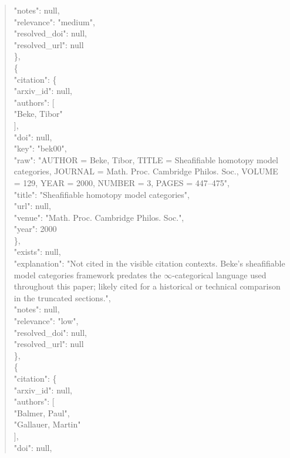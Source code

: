 \documentclass[11pt]{article}
\begin{document}
\begin{quote}
      "notes": null,\\
      "relevance": "medium",\\
      "resolved\_doi": null,\\
      "resolved\_url": null\\
    \},\\
    \{\\
      "citation": \{\\
        "arxiv\_id": null,\\
        "authors": [\\
          "Beke, Tibor"\\
        ],\\
        "doi": null,\\
        "key": "bek00",\\
        "raw": "AUTHOR = Beke, Tibor, TITLE = Sheafifiable homotopy model categories, JOURNAL = Math. Proc. Cambridge Philos. Soc., VOLUME = 129, YEAR = 2000, NUMBER = 3, PAGES = 447--475",\\
        "title": "Sheafifiable homotopy model categories",\\
        "url": null,\\
        "venue": "Math. Proc. Cambridge Philos. Soc.",\\
        "year": 2000\\
      \},\\
      "exists": null,\\
      "explanation": "Not cited in the visible citation contexts. Beke's sheafifiable model categories framework predates the \ensuremath{\infty}-categorical language used throughout this paper; likely cited for a historical or technical comparison in the truncated sections.",\\
      "notes": null,\\
      "relevance": "low",\\
      "resolved\_doi": null,\\
      "resolved\_url": null\\
    \},\\
    \{\\
      "citation": \{\\
        "arxiv\_id": null,\\
        "authors": [\\
          "Balmer, Paul",\\
          "Gallauer, Martin"\\
        ],\\
        "doi": null,\\

\end{quote}
\end{document}
